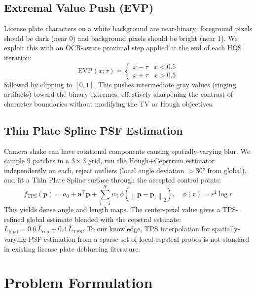 \documentclass[12pt,a4paper]{article}
\newcommand{\norm}[1]{\left\lVert#1\right\rVert}
\begin{document}
\subsection{Extremal Value Push (EVP)}

License plate characters on a white background are near-binary: foreground pixels should
be dark (near 0) and background pixels should be bright (near 1). We exploit this with
an OCR-aware proximal step applied at the end of each HQS iteration:
\begin{equation}
  \mathrm{EVP}(x; \tau) =
  \begin{cases}
    x - \tau      & x < 0.5 \\
    x + \tau      & x > 0.5
  \end{cases}
  \label{eq:evp}
\end{equation}
followed by clipping to $[0,1]$. This pushes intermediate gray values (ringing artifacts)
toward the binary extremes, effectively sharpening the contrast of character boundaries
without modifying the TV or Hough objectives.

\subsection{Thin Plate Spline PSF Estimation}

Camera shake can have rotational components causing spatially-varying blur. We sample 9
patches in a $3{\times}3$ grid, run the Hough+Cepstrum estimator independently on each,
reject outliers (local angle deviation $> 30°$ from global), and fit a Thin Plate Spline
surface through the accepted control points:
\begin{equation}
  f_\mathrm{TPS}(\mathbf{p}) = a_0 + \mathbf{a}^\top\!\mathbf{p}
    + \sum_{i=1}^{N} w_i\,\phi\!\left(\norm{\mathbf{p}-\mathbf{p}_i}_2\right),
  \quad \phi(r)=r^2\log r
  \label{eq:tps}
\end{equation}
This yields dense angle and length maps. The center-pixel value gives a TPS-refined global
estimate blended with the cepstral estimate:
$L_{\mathrm{final}} = 0.6\,\hat{L}_{\mathrm{cep}} + 0.4\,\hat{L}_{\mathrm{TPS}}$.
To our knowledge, TPS interpolation for spatially-varying PSF estimation from a sparse
set of local cepstral probes is not standard in existing license plate deblurring literature.

\section{Problem Formulation}
\end{document}
